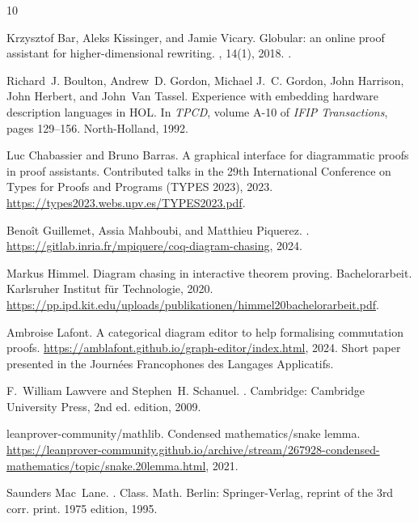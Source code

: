 \documentclass[10pt,a4paper]{article}
\renewcommand{\~}{\widetilde}
\begin{document}
\begin{thebibliography}{10}

Krzysztof Bar, Aleks Kissinger, and Jamie Vicary.
\newblock Globular: an online proof assistant for higher-dimensional rewriting.
, 14(1), 2018.
\newblock \href {https://doi.org/10.23638/LMCS-14(1:8)2018}
  {}.

Richard~J. Boulton, Andrew~D. Gordon, Michael J.~C. Gordon, John Harrison, John
  Herbert, and John~Van Tassel.
\newblock Experience with embedding hardware description languages in {HOL}.
\newblock In {\em {TPCD}}, volume {A-10} of {\em {IFIP} Transactions}, pages
  129--156. North-Holland, 1992.

Luc Chabassier and Bruno Barras.
\newblock A graphical interface for diagrammatic proofs in proof assistants.
\newblock Contributed talks in the 29th International Conference on Types for
  Proofs and Programs (TYPES 2023), 2023.
\newblock \url{https://types2023.webs.upv.es/TYPES2023.pdf}.

Benoît Guillemet, Assia Mahboubi, and Matthieu Piquerez.
.
\newblock \url{https://gitlab.inria.fr/mpiquere/coq-diagram-chasing}, 2024.

Markus Himmel.
\newblock Diagram chasing in interactive theorem proving.
\newblock Bachelorarbeit. Karlsruher Institut für Technologie, 2020.
\newblock
  \url{https://pp.ipd.kit.edu/uploads/publikationen/himmel20bachelorarbeit.pdf}.

Ambroise Lafont.
\newblock A categorical diagram editor to help formalising commutation proofs.
\newblock \url{https://amblafont.github.io/graph-editor/index.html}, 2024.
\newblock Short paper presented in the Journées Francophones des Langages
  Applicatifs.

F.~William Lawvere and Stephen~H. Schanuel.
.
\newblock Cambridge: Cambridge University Press, 2nd ed. edition, 2009.

{leanprover-community/mathlib}.
\newblock Condensed mathematics/snake lemma.
\newblock
  \url{https://leanprover-community.github.io/archive/stream/267928-condensed-mathematics/topic/snake.20lemma.html},
  2021.

Saunders Mac~Lane.
.
\newblock Class. Math. Berlin: Springer-Verlag, reprint of the 3rd corr. print.
  1975 edition, 1995.


\end{thebibliography}
\end{document}
